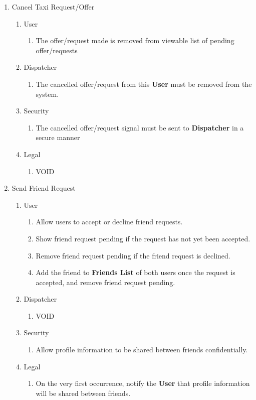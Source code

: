 \documentclass[english]{article}
\begin{document}
\begin{enumerate}[{BE}1.]
	\item Cancel Taxi Request/Offer
	\begin{enumerate}[{VP7}.1]
		\item User
			\begin{enumerate}
				\item The offer/request made is removed from viewable list of pending offer/requests
			\end{enumerate}
		\item Dispatcher
			\begin{enumerate}
				\item The cancelled offer/request from this \textbf{User} must be removed from the system.
			\end{enumerate}
		\item Security
			\begin{enumerate}
				\item The cancelled offer/request signal must be sent to \textbf{Dispatcher} in a secure manner
			\end{enumerate}
		\item Legal
			\begin{enumerate}
				\item VOID
			\end{enumerate}
	\end{enumerate}
	
	\item Send Friend Request
	\begin{enumerate}[{VP8}.1]
		\item User
			\begin{enumerate}
				\item Allow users to accept or decline friend requests.
				\item Show friend request pending if the request has not yet been accepted.
				\item Remove friend request pending if the friend request is declined.
				\item Add the friend to \textbf{Friends List} of both users once the request is accepted, and remove friend request pending.
			\end{enumerate}
		\item Dispatcher
			\begin{enumerate}
				\item VOID
			\end{enumerate}
		\item Security
			\begin{enumerate}
				\item Allow profile information to be shared between friends confidentially.
			\end{enumerate}
		\item Legal
			\begin{enumerate}
				\item On the very first occurrence, notify the \textbf{User} that profile information will be shared between friends.
			\end{enumerate}
	\end{enumerate}
	

\end{enumerate}
\end{document}
